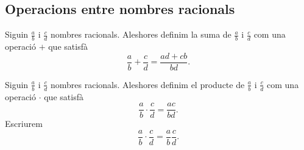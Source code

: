 \documentclass[../Apunts.tex]{subfiles}
\begin{document}
	\subsection{Operacions entre nombres racionals}
	\begin{definition}
		\label{def:suma de nombres racionals}
		Siguin \(\frac{a}{b}\) i \(\frac{c}{d}\) nombres racionals. Aleshores definim la suma de \(\frac{a}{b}\) i \(\frac{c}{d}\) com una operació \(+\) que satisfà
		\[\frac{a}{b}+\frac{c}{d}=\frac{ad+cb}{bd}.\]
	\end{definition}
	\begin{definition}
		\label{def:producte de nombres racionals}
		Siguin \(\frac{a}{b}\) i \(\frac{c}{d}\) nombres racionals. Aleshores definim el producte de \(\frac{a}{b}\) i \(\frac{c}{d}\) com una operació \(\cdot\) que satisfà
		\[\frac{a}{b}\cdot\frac{c}{d}=\frac{ac}{bd}.\]
		Escriurem
		\[\frac{a}{b}\cdot\frac{c}{d}=\frac{a}{b}\frac{c}{d}.\]
	\end{definition}
\end{document}
